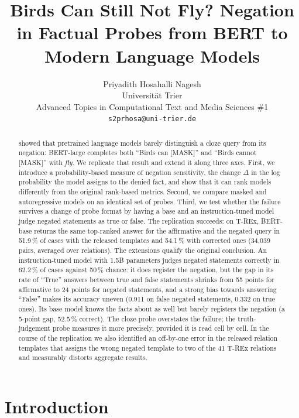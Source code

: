 \documentclass{article}
\title{Birds Can Still Not Fly? Negation in Factual Probes from BERT to Modern Language Models}
\author{
  Priyadith Hosahalli Nagesh \\
  Universität Trier \\
  Advanced Topics in Computational Text and Media Sciences \#1 \\
  \texttt{s2prhosa@uni-trier.de} \\
}
\begin{document}
\maketitle

\begin{abstract}
\citet{kassner2020} showed that pretrained language models barely distinguish a cloze query from its negation: BERT-large completes both ``Birds can [MASK]'' and ``Birds cannot [MASK]'' with \emph{fly}. We replicate that result and extend it along three axes. First, we introduce a
probability-based measure of negation sensitivity, the change $\Delta$ in the log probability the
model assigns to the denied fact, and show that it can rank models differently from the original rank-based metrics. Second, we compare masked and autoregressive models on an identical set of probes. Third, we test whether the failure survives a change of probe format by
having a base and an instruction-tuned model judge negated statements as true or false. The replication succeeds:
on T-REx, BERT-base returns the same top-ranked answer for the affirmative and the negated query in
51.9\,\% of cases with the released templates and 54.1\,\% with corrected ones (34{,}039 pairs, averaged over relations). The extensions qualify the original conclusion. An instruction-tuned model
with 1.5B parameters judges negated statements correctly in 62.2\,\% of cases against 50\,\% chance: it does register the negation, but the gap in its rate of ``True'' answers between true and false statements shrinks from 55 points for affirmative to 24 points for negated statements, and a strong bias towards answering ``False'' makes its accuracy uneven (0.911 on false negated statements, 0.332 on true ones). Its base model knows the facts about as well but barely registers the negation (a 5-point gap, 52.5\,\% correct). The cloze probe overstates the failure; the truth-judgement probe measures it more precisely, provided it is read cell by cell. In the course of the replication we also
identified an off-by-one error in the released relation templates that assigns the wrong negated
template to two of the 41 T-REx relations and measurably distorts aggregate results.
\end{abstract}


\section{Introduction}
\label{sec:intro}
\end{document}
